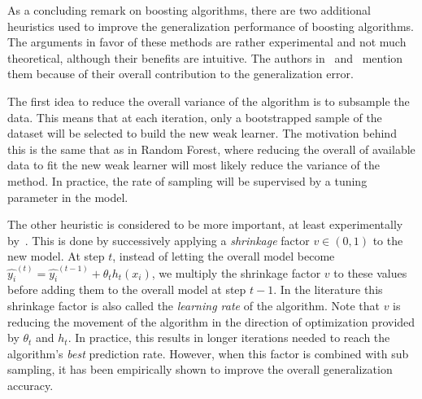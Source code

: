 As a concluding remark on boosting algorithms, there are two additional heuristics used to improve the generalization performance of boosting algorithms. The arguments in favor of these methods are rather experimental and not much theoretical, although their benefits are intuitive. The authors in~\textcite{hastie-elemstatslearn} and~\textcite{bishop-patternRecognition} mention them because of their overall contribution to the generalization error.

The first idea to reduce the overall variance of the algorithm is to subsample the data. This means that at each iteration, only a bootstrapped sample of the dataset will be selected to build the new weak learner. The motivation behind this is the same that as in Random Forest, where reducing the overall of available data to fit the new weak learner will most likely reduce the variance of the method. In practice, the rate of sampling will be supervised by a tuning parameter in the model.

The other heuristic is considered to be more important, at least experimentally by~\textcite{hastie-elemstatslearn}. This is done by successively applying a \textit{shrinkage} factor $v \in (0,1)$ to the new model. At step $t$, instead of letting the overall model become $ \hat{y_i}^{(t)} = \hat{y_i}^{(t-1)} + \theta_t h_t(x_i) $, we multiply the shrinkage factor $v$ to these values before adding them to the overall model at step $t-1$. In the literature this shrinkage factor is also called the \textit{learning rate} of the algorithm. Note that $v$ is reducing the movement of the algorithm in the direction of optimization provided by $\theta_t$ and $h_t$. In practice, this results in longer iterations needed to reach the algorithm's \textit{best} prediction rate. However, when this factor is combined with sub sampling, it has been empirically shown to improve the overall generalization accuracy.



%
%
%
%
